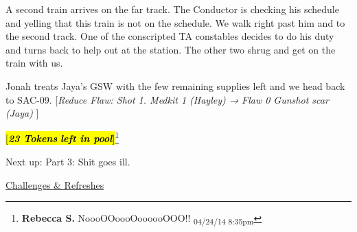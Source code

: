 A second train arrives on the far track.  The Conductor is checking his schedule and yelling that this train is not on the schedule. We walk right past him and to the second track.  One of the conscripted TA constables decides to do his duty and turns back to help out at the station.  The other two shrug and get on the train with us.



Jonah treats Jaya's GSW with the few remaining supplies left and we head back to SAC-09.  {[}\textit{Reduce Flaw: Shot 1.  Medkit 1 (Hayley) →  }\textit{ {\color[RGB]{255,0,0}Flaw 0 Gunshot scar (Jaya)} }{]}



\hl{{[}\textit{\textbf{23 Tokens}}\textit{\textbf{ left in pool}}{]}}\footnote{\textbf{Rebecca S. }NoooOOoooOoooooOOO!! \textsubscript{04/24/14 8:35pm}}



Next up: Part 3: Shit goes ill.





\underline{  {\LARGE Challenges \& Refreshes }  }



